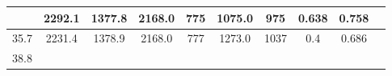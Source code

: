 \documentclass[a4paper,12pt]{article}
\begin{document}
\begin{longtable}{
     |
%    
    c|
%    
    c|
%    
    c|
%    
    c|
%    
    c|
%    
    c|
%    
    c|
%    
    c|
%    
    c|
%    
    c|
%    
    }
%        
        & 2292.1
%        

%        

%        
        & 1377.8
%        

%        

%        
        & 2168.0
%        

%        

%        
        & 775
%        

%        

%        
        & 1075.0
%        

%        

%        
        & 975
%        

%        

%        
        & 0.638
%        

%        

%        
        & 0.758
%        

%        
        \\
        \hline

        

%        

%        
        35.7
%        

%        

%        
        & 2231.4
%        

%        

%        
        & 1378.9
%        

%        

%        
        & 2168.0
%        

%        

%        
        & 777
%        

%        

%        
        & 1273.0
%        

%        

%        
        & 1037
%        

%        

%        
        & 0.4
%        

%        

%        
        & 0.686
%        

%        
        \\
        \hline

        

%        

%        
        38.8
%        

%        


\end{longtable}
\end{document}
